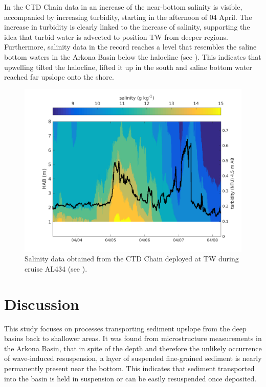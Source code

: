  In the CTD Chain data in  an increase of the 
near-bottom salinity is visible, accompanied by increasing turbidity, starting 
in the afternoon of 04 April. The increase in turbidity is clearly linked to 
the increase of salinity, supporting the idea that turbid water is advected to 
position TW from deeper regions. Furthermore, salinity data in the record 
reaches a level that resembles the saline bottom waters in the Arkona Basin 
below the halocline (see ). This indicates that upwelling 
tilted the halocline, lifted it up in the south and saline bottom water 
reached far upslope onto the shore.

 \begin{figure}[ht]
\includegraphics[width=17cm]{bilder/ctdchaintw.png}
 \caption{Salinity data obtained from the CTD Chain deployed at TW 
during cruise AL434 (see ).}
 \label{ctdchain}
 \end{figure}

\FloatBarrier
\section{Discussion}

This study focuses on processes transporting sediment upslope 
from the deep basins back to shallower areas. It was found from 
microstructure measurements in the Arkona Basin, that in spite of the depth and 
therefore the unlikely occurrence of wave-induced resuspension, a layer of 
suspended fine-grained sediment is nearly permanently present near the bottom. 
This indicates that sediment transported into the basin is held in 
suspension or can be easily resuspended once deposited.

